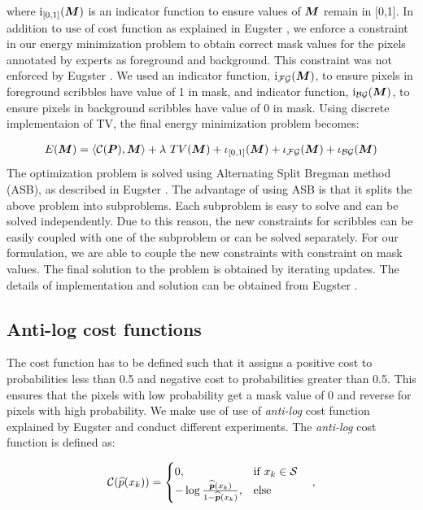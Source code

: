 where $\mathrm{i}_{[0,1]}(\boldsymbol{M})$ is an indicator function to ensure values of $\boldsymbol{M}$ remain in [0,1]. In addition to use of cost function as explained in Eugster \cite{dominic}, we enforce a constraint in our energy minimization problem to obtain correct mask values for the pixels annotated by experts as foreground and background. This constraint was not enforced by Eugster \cite{dominic}. We used an indicator function, $\mathrm{i}_{\mathcal{FG}}(\boldsymbol{M})$, to ensure pixels in foreground scribbles have value of 1 in mask, and indicator function, $\mathrm{i}_{\mathcal{BG}}(\boldsymbol{M})$, to ensure pixels in background scribbles have value of 0 in mask. Using discrete implementaion of TV, the final energy minimization problem becomes:

\begin{align}
\mathop{{}E}(\boldsymbol{M}) = \langle\mathcal{C}(\boldsymbol{P}), \boldsymbol{M}\rangle + \lambda\, \mathop{{}TV}(\boldsymbol{M}) + \iota_{[0,1]}(\boldsymbol{M}) + \iota_{\mathcal{FG}}(\boldsymbol{M})  + \iota_{\mathcal{BG}}(\boldsymbol{M}) 
\end{align}
The optimization problem is solved using Alternating Split Bregman method (ASB), as described in Eugster \cite{dominic}. The advantage of using ASB is that it splits the above problem into subproblems. Each subproblem is easy to solve and can be solved independently. Due to this reason, the new constraints for scribbles can be easily coupled with one of the subproblem or can be solved separately. For our formulation, we are able to couple the new constraints with constraint on mask values. The final solution to the problem is obtained by iterating updates. The details of implementation and solution can be obtained from Eugster \cite{dominic}. 


\subsection{Anti-log cost functions}
The cost function has to be defined such that it assigns a positive cost to probabilities less than 0.5 and negative cost to probabilities greater than 0.5. This ensures that the pixels with low probability get a mask value of 0 and reverse for pixels with high probability. We make use of use of \textit{anti-log} cost function explained by Eugster \cite{dominic} and conduct different experiments. The \textit{anti-log} cost function is defined as:

\begin{align*}
\mathcal{C}(\widehat{p}(x_{k})) =
\begin{cases}
  0, & \text{if}\ x_k \in \mathcal{S}  \\
  -\log \frac{\widehat{\boldsymbol{p}}(x_{k})}{1-\widehat{\boldsymbol{p}}(x_{k})}, & \text{else} 
\end{cases} \quad ,
\end{align*} 

